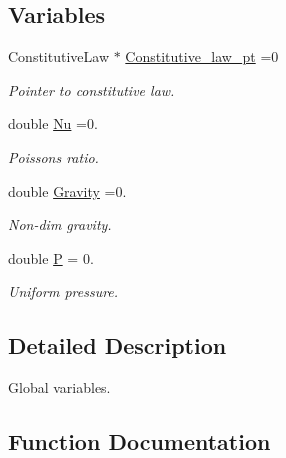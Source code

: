 \subsection*{Variables}
\begin{DoxyCompactItemize}
\item 
Constitutive\+Law $\ast$ \hyperlink{namespaceGlobal__Physical__Variables_a5d5f19442938130d36ee7476ae25049c}{Constitutive\+\_\+law\+\_\+pt} =0
\begin{DoxyCompactList}\small\item\em Pointer to constitutive law. \end{DoxyCompactList}\item 
double \hyperlink{namespaceGlobal__Physical__Variables_a3962c36313826b19f216f6bbbdd6a477}{Nu} =0.
\begin{DoxyCompactList}\small\item\em Poisson\textquotesingle{}s ratio. \end{DoxyCompactList}\item 
double \hyperlink{namespaceGlobal__Physical__Variables_a8b80d3e8d63b8d0a0ed435a2dd7fe2ad}{Gravity} =0.
\begin{DoxyCompactList}\small\item\em Non-\/dim gravity. \end{DoxyCompactList}\item 
double \hyperlink{namespaceGlobal__Physical__Variables_a23c2ade6398f54040b869f7f3a2bcc4b}{P} = 0.
\begin{DoxyCompactList}\small\item\em Uniform pressure. \end{DoxyCompactList}\end{DoxyCompactItemize}


\subsection{Detailed Description}
Global variables. 

\subsection{Function Documentation}
\mbox{\label{namespaceGlobal__Physical__Variables_a19f4e20a92e7d216b4d2b00308f96917}} 
